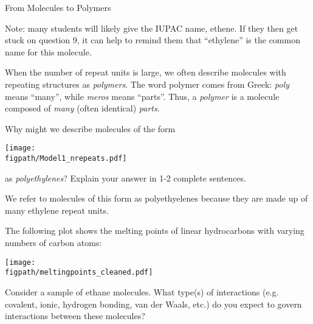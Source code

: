 \begin{activity}{From Molecules to Polymers}
\begin{ctqs}
\begin{solution}[0.75in]
			Note: many students will likely give the IUPAC name, ethene.  If they then get stuck on question 9, it can help to remind them that ``ethylene'' is the common name for this molecule.
		\end{solution}
	
\end{ctqs}

\begin{infobox}
	When the number of repeat units is large, we often describe molecules with repeating structures as \emph{polymers}.  The word polymer comes from Greek: \emph{poly} means ``many'', while \emph{meros} means ``parts''.  Thus, a \emph{polymer} is a molecule composed of \emph{many} (often identical) \emph{parts}.
\end{infobox}

\begin{ctqs}
	\question Why might we describe molecules of the form
	
		\centerline{\texttt{[image: \\figpath/Model1\_nrepeats.pdf]}}
			
		as \emph{polyethylenes}?  Explain your answer in 1-2 complete sentences.
		
		\begin{solution}[2in]
			We refer to molecules of this form as polyethyelenes because they are made up of many ethylene repeat units.
		\end{solution}
\end{ctqs}

\clearpage
\begin{model}
	\label{\labelbase:mdl:hydrocarbonmelting}

	The following plot shows the melting points of linear hydrocarbons with varying numbers of carbon atoms:
	
	\vspace{6pt}
	
	\centerline{\texttt{[image: \\figpath/meltingpoints\_cleaned.pdf]}}
	
	\vspace{6pt}

\end{model}

\begin{ctqs}
	
	\question Consider a sample of ethane molecules.  What type(s) of interactions (e.g. covalent, ionic, hydrogen bonding, van der Waals, etc.) do you expect to govern interactions between these molecules?%
	

\end{ctqs}
\end{activity}
